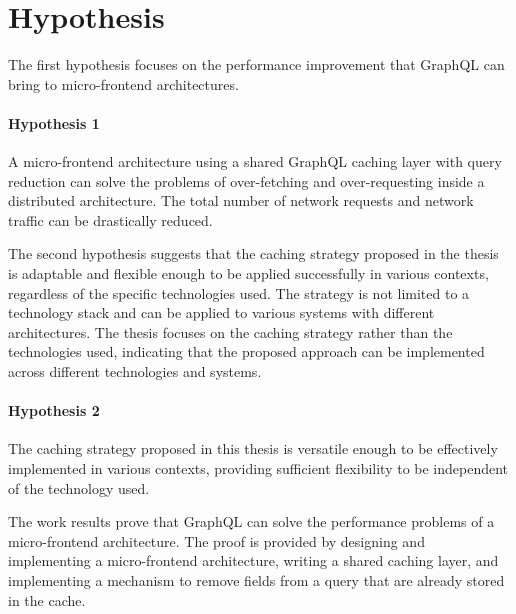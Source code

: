 \section{Hypothesis}\label{section:introduction:hypothesis}

The first hypothesis focuses on the performance improvement that GraphQL can bring to micro-frontend architectures.

\paragraph{Hypothesis 1} 
A micro-frontend architecture using a shared GraphQL caching layer with query reduction can solve the problems of over-fetching and over-requesting inside a distributed architecture. The total number of network requests and network traffic can be drastically reduced.

\bigskip

\noindent The second hypothesis suggests that the caching strategy proposed in the thesis is adaptable and flexible enough to be applied successfully in various contexts, regardless of the specific technologies used. The strategy is not limited to a technology stack and can be applied to various systems with different architectures. The thesis focuses on the caching strategy rather than the technologies used, indicating that the proposed approach can be implemented across different technologies and systems.

\paragraph{Hypothesis 2}
The caching strategy proposed in this thesis is versatile enough to be effectively implemented in various contexts, providing sufficient flexibility to be independent of the technology used.

\bigskip

\noindent The work results prove that GraphQL can solve the performance problems of a micro-frontend architecture. The proof is provided by designing and implementing a micro-frontend architecture, writing a shared caching layer, and implementing a mechanism to remove fields from a query that are already stored in the cache.
